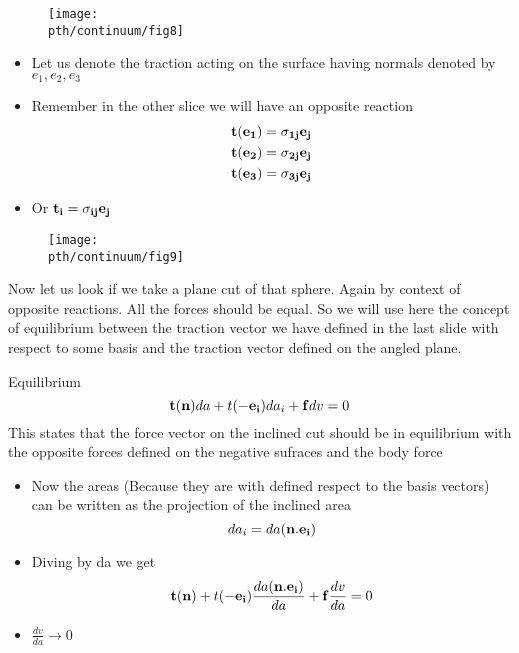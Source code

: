 	\begin{frame}
		\begin{figure}
			\centering
			\texttt{[image: \\pth/continuum/fig8]}
		\end{figure}
	
		\begin{itemize}
			\item Let us denote the traction acting on the surface having normals denoted by $e_1, e_2,e_3$
			\item Remember in the other slice we will have an opposite reaction
			\begin{equation}
			\begin{aligned}
			\mathbf{t(e_1) = \sigma_{1j}e_j} \\\mathbf{t(e_2) = \sigma_{2j}e_j}\\\mathbf{t(e_3) = \sigma_{3j}e_j}
			\end{aligned}
			\end{equation}
			\item Or $\mathbf{t_i = \sigma_{ij}e_j}$
		\end{itemize}
	\end{frame}

	\begin{frame}
		\begin{figure}
			\centering
			\texttt{[image: \\pth/continuum/fig9]}
		\end{figure}
		
		Now let us look if we take a plane cut of that sphere. Again by context of opposite reactions. All the forces should be equal. So we will use here the concept of equilibrium between the traction vector we have defined in the last slide with respect to some basis and the traction vector defined on the angled plane.
		
		\begin{block}{Equilibrium}
			\begin{equation}
			\mathbf{t(n)}da + t(\mathbf{-e_i})da_i + \mathbf{f}dv = 0
			\end{equation}
			This states that the force vector on the inclined cut should be in equilibrium with the opposite forces defined on the negative sufraces and the body force
		\end{block}
	
	\end{frame}

	\begin{frame}
		\begin{itemize}
			\item  Now the areas (Because they are with defined respect to the basis vectors) can be written as the projection of the inclined area
			\begin{equation}
				da_i = da(\mathbf{n.e_i})
			\end{equation}
			\item Diving by da we get 
			\begin{equation}
			\mathbf{t(n)} + t(\mathbf{-e_i})\frac{da(\mathbf{n.e_i})}{da} + \mathbf{f}\frac{dv}{da} = 0
			\end{equation}
			\item $\frac{dv}{da} \rightarrow 0$ 
		\end{itemize}
	\end{frame}
